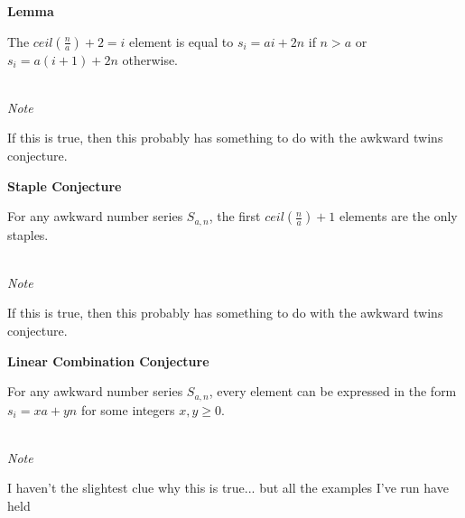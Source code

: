 \documentclass[a4paper,12pt]{article}
\begin{document}
\label{lemma:beyond_initial_staple}
\hypertarget{lemma:beyond_initial_staple}{}
\begin{tcolorbox}
\textbf{Lemma}

The $ceil(\frac{n}{a}) + 2 = i$ element is equal to $s_i = ai + 2n$ if $n > a$ or $s_i = a(i + 1) + 2n$ otherwise. 
\end{tcolorbox}

\noindent \\
\textit{Note}

\noindent If this is true, then this probably has something to do with the awkward twins conjecture.




\label{conjecture:staple_conjecture}
\hypertarget{conjecture:staple_conjecture}{}
\begin{tcolorbox}
\textbf{Staple Conjecture}

For any awkward number series $S_{a,n}$, the first $ceil(\frac{n}{a}) + 1$ elements are the only staples.
\end{tcolorbox}

\noindent \\
\textit{Note}

\noindent If this is true, then this probably has something to do with the awkward twins conjecture.









\label{conjecture:linear_combo_conjecture}
\hypertarget{conjecture:linear_combo_conjecture}{}
\begin{tcolorbox}
\textbf{Linear Combination Conjecture}

For any awkward number series $S_{a,n}$, every element can be expressed in the form $s_i = xa + yn$ for some integers $x, y \geq 0$.
\end{tcolorbox}

\noindent \\
\textit{Note}

\noindent I haven't the slightest clue why this is true... but all the examples I've run have held
\end{document}
